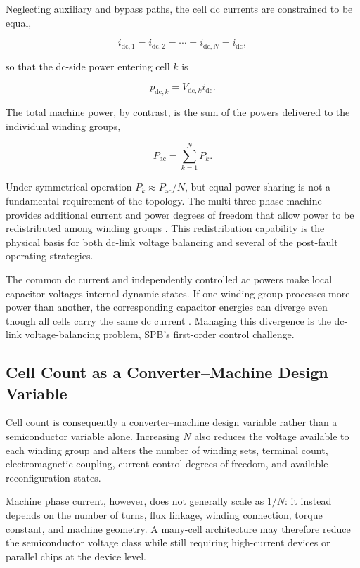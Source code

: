 Neglecting auxiliary and bypass paths, the cell dc currents are constrained to be equal,

\begin{equation}
i_{\mathrm{dc},1}=i_{\mathrm{dc},2}=\cdots=i_{\mathrm{dc},N}
=i_{\mathrm{dc}},
\label{eq:series_current}
\end{equation}

so that the dc-side power entering cell $k$ is

\begin{equation}
p_{\mathrm{dc},k}=V_{\mathrm{dc},k}i_{\mathrm{dc}}.
\label{eq:cell_dc_power}
\end{equation}

The total machine power, by contrast, is the sum of the powers
delivered to the individual winding groups,

\begin{equation}
P_{\mathrm{ac}}=\sum_{k=1}^{N}P_k.
\label{eq:power_sum}
\end{equation}

Under symmetrical operation $P_k\approx P_{\mathrm{ac}}/N$, but equal
power sharing is not a fundamental requirement of the topology.
The multi-three-phase machine provides additional current and power
degrees of freedom that allow power to be redistributed among winding
groups
\cite{Che2014SeriesConnected,Verkroost2024PowerDistribution}.
This redistribution capability is the physical basis for both dc-link
voltage balancing and several of the post-fault operating strategies.

The common dc current and independently controlled ac powers make
local capacitor voltages internal dynamic states. If one winding group processes more power than
another, the corresponding capacitor energies can diverge even though
all cells carry the same dc current \cite{Nikouie2015Stability,Nikouie2017Stability}. Managing this divergence is the dc-link
voltage-balancing problem, SPB's first-order control challenge.

\subsection{Cell Count as a Converter--Machine Design Variable}

Cell count is consequently a converter--machine design variable rather
than a semiconductor variable alone.
Increasing $N$ also reduces the voltage available to each winding group and
alters the number of winding sets, terminal count, electromagnetic
coupling, current-control degrees of freedom, and available
reconfiguration states.

Machine phase current, however, does not generally scale as $1/N$: it
instead depends on the number of turns, flux linkage, winding
connection, torque constant, and machine geometry. A many-cell
architecture may therefore reduce the semiconductor voltage class
while still requiring high-current devices or parallel chips at the
device level.
